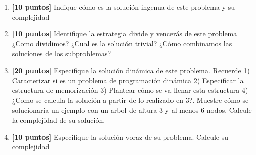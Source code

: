 \documentclass[9pt,twocolumn]{article}
\begin{document}
\begin{enumerate}
	\item \textbf{[10 puntos]} Indique cómo es la solución ingenua de este problema y su complejidad 
	\item \textbf{[10 puntos]} Identifique la estrategia divide y vencerás de este problema ¿Como dividimos? ¿Cual es la solución trivial? ¿Cómo combinamos las soluciones de los subproblemas?
	\item \textbf{[20 puntos]} Especifique la solución dinámica de este problema. Recuerde 1) Caracterizar si es un problema de programación dinámica 2) Especificar la estructura de memorización 3) Plantear cómo se va llenar esta estructura 4) ¿Como se calcula la solución a partir de lo realizado en 3?. Muestre cómo se solucionaría un ejemplo con un arbol de altura 3 y al menos 6 nodos. Calcule la complejidad de su solución.
	\item \textbf{[10 puntos]} Especifique la solución voraz de su problema. Calcule su complejidad
\end{enumerate}
\end{document}

